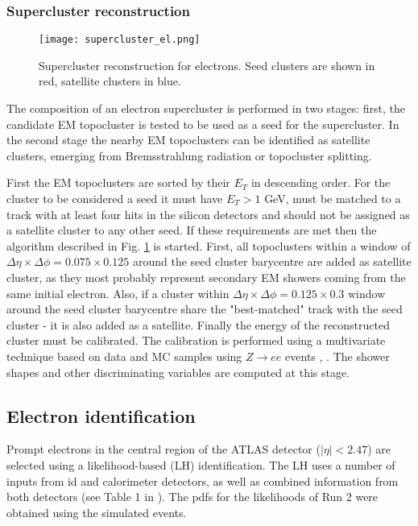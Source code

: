  	\subsubsection{Supercluster reconstruction}
 	\begin{figure}[htbp]
 		\centering
 		\texttt{[image: supercluster\_el.png]}
 		\caption[Supercluster reconstruction]{Supercluster reconstruction for electrons. Seed clusters are shown in red, satellite clusters in blue.}
 		\label{fig::supercluster}
 	\end{figure}
 	The composition of an electron supercluster is performed in two stages: first, the candidate EM topocluster is tested to be used as a seed for the supercluster. In the second stage the nearby EM topoclusters can be identified as satellite clusters, emerging from Bremsstrahlung radiation or topocluster splitting.
 	
 	First the EM topoclusters are sorted by their $E_T$ in descending order. For the cluster to be considered a seed it must have $E_T>1$ GeV, must be matched to a track with at least four hits in the silicon detectors and should not be assigned as a satellite cluster to any other seed. If these requirements are met then the algorithm described in Fig. \ref{fig::supercluster} is started. First, all topoclusters within a window of  $\Delta \eta \times \Delta \phi = 0.075 \times 0.125$ around the seed cluster barycentre are added as satellite cluster, as they most probably represent secondary EM showers coming from the same initial electron. Also, if a cluster within $\Delta \eta \times \Delta \phi = 0.125 \times 0.3$ window around the seed cluster barycentre share the "best-matched" track with the seed cluster - it is also added as a satellite.
  	Finally the energy of the reconstructed cluster must be calibrated. The calibration is performed using a multivariate technique based on data and MC samples using $Z \rightarrow ee$ events \cite{Aaboud:2018ugz}, \cite {Aaboud:2018yqu}. The shower shapes and other discriminating variables are computed at this stage.
    \subsection{Electron identification}
    Prompt electrons in the central region of the ATLAS detector ($|\eta|<2.47$) are selected using a likelihood-based (LH) identification. The LH uses a number of inputs from \gls{id} and calorimeter detectors, as well as combined information from both detectors (see Table 1 in \cite{electrons_reco1}). The \gls{pdfs} for the likelihoods of Run 2 were obtained using the simulated events.
    
